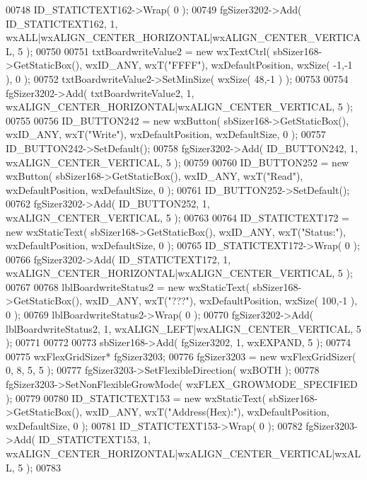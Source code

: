 \begin{DoxyCode}
00748     ID_STATICTEXT162->Wrap( 0 );
00749     fgSizer3202->Add( ID_STATICTEXT162, 1, wxALL|wxALIGN\_CENTER\_HORIZONTAL|wxALIGN\_CENTER\_VERTICAL, 5 );
00750     
00751     txtBoardwriteValue2 = \textcolor{keyword}{new} wxTextCtrl( sbSizer168->GetStaticBox(), wxID\_ANY, wxT(\textcolor{stringliteral}{"FFFF"}), 
      wxDefaultPosition, wxSize( -1,-1 ), 0 );
00752     txtBoardwriteValue2->SetMinSize( wxSize( 48,-1 ) );
00753     
00754     fgSizer3202->Add( txtBoardwriteValue2, 1, wxALIGN\_CENTER\_HORIZONTAL|wxALIGN\_CENTER\_VERTICAL, 5 );
00755     
00756     ID_BUTTON242 = \textcolor{keyword}{new} wxButton( sbSizer168->GetStaticBox(), wxID\_ANY, wxT(\textcolor{stringliteral}{"Write"}), wxDefaultPosition, 
      wxDefaultSize, 0 );
00757     ID_BUTTON242->SetDefault(); 
00758     fgSizer3202->Add( ID_BUTTON242, 1, wxALIGN\_CENTER\_VERTICAL, 5 );
00759     
00760     ID_BUTTON252 = \textcolor{keyword}{new} wxButton( sbSizer168->GetStaticBox(), wxID\_ANY, wxT(\textcolor{stringliteral}{"Read"}), wxDefaultPosition, 
      wxDefaultSize, 0 );
00761     ID_BUTTON252->SetDefault(); 
00762     fgSizer3202->Add( ID_BUTTON252, 1, wxALIGN\_CENTER\_VERTICAL, 5 );
00763     
00764     ID_STATICTEXT172 = \textcolor{keyword}{new} wxStaticText( sbSizer168->GetStaticBox(), wxID\_ANY, wxT(\textcolor{stringliteral}{"Status:"}), 
      wxDefaultPosition, wxDefaultSize, 0 );
00765     ID_STATICTEXT172->Wrap( 0 );
00766     fgSizer3202->Add( ID_STATICTEXT172, 1, wxALIGN\_CENTER\_HORIZONTAL|wxALIGN\_CENTER\_VERTICAL, 5 );
00767     
00768     lblBoardwriteStatus2 = \textcolor{keyword}{new} wxStaticText( sbSizer168->GetStaticBox(), wxID\_ANY, wxT(\textcolor{stringliteral}{"???"}), 
      wxDefaultPosition, wxSize( 100,-1 ), 0 );
00769     lblBoardwriteStatus2->Wrap( 0 );
00770     fgSizer3202->Add( lblBoardwriteStatus2, 1, wxALIGN\_LEFT|wxALIGN\_CENTER\_VERTICAL, 5 );
00771     
00772     
00773     sbSizer168->Add( fgSizer3202, 1, wxEXPAND, 5 );
00774     
00775     wxFlexGridSizer* fgSizer3203;
00776     fgSizer3203 = \textcolor{keyword}{new} wxFlexGridSizer( 0, 8, 5, 5 );
00777     fgSizer3203->SetFlexibleDirection( wxBOTH );
00778     fgSizer3203->SetNonFlexibleGrowMode( wxFLEX\_GROWMODE\_SPECIFIED );
00779     
00780     ID_STATICTEXT153 = \textcolor{keyword}{new} wxStaticText( sbSizer168->GetStaticBox(), wxID\_ANY, wxT(\textcolor{stringliteral}{"Address(Hex):"}), 
      wxDefaultPosition, wxDefaultSize, 0 );
00781     ID_STATICTEXT153->Wrap( 0 );
00782     fgSizer3203->Add( ID_STATICTEXT153, 1, wxALIGN\_CENTER\_HORIZONTAL|wxALIGN\_CENTER\_VERTICAL|wxALL, 5 );
00783     

\end{DoxyCode}
